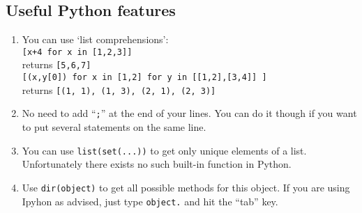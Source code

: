 \documentclass[a4paper,11pt]{article}
\begin{document}
\subsection{Useful Python features}
\begin{enumerate}
\item You can use `list comprehensions':\\
\texttt{[x+4 for x in [1,2,3]]} \\
returns \texttt{[5,6,7]} \\
\texttt{[(x,y[0]) for x in [1,2] for y in [[1,2],[3,4]] ]}\\
returns \texttt{[(1, 1), (1, 3), (2, 1), (2, 3)]}
\item No need to add ``\texttt{;}'' at the end of your lines. You can do it though if you want to put several statements on the same line.
\item You can use \texttt{list(set(...))} to get only unique elements of a list. Unfortunately there exists no such built-in function in Python.
\item Use \texttt{dir(object)} to get all possible methods for this object. If you are using Ipyhon as advised, just type \texttt{object.} and hit the ``tab'' key.
\end{enumerate}
\end{document}
